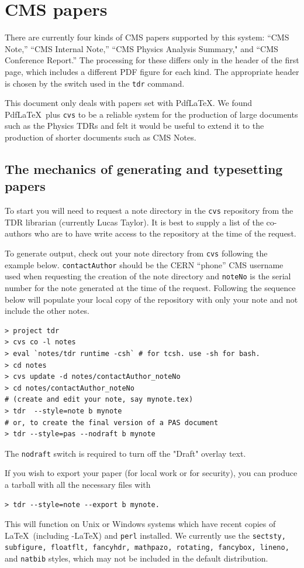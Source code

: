 \section{CMS papers}
There are currently four kinds of CMS papers supported by this system: ``CMS Note,''
``CMS Internal Note,''    ``CMS Physics Analysis Summary," and ``CMS Conference Report.''
The processing for these differs only in the header of the first page,
which includes a different PDF figure  for each kind. The
appropriate header is chosen by the switch used in the
\texttt{tdr}
command.

This document only deals with papers set with Pdf\LaTeX. We found Pdf\LaTeX\ plus \texttt{cvs} to be a reliable system for the production of
large documents such as the Physics TDRs and felt it would be useful to extend it to the production of shorter documents such as CMS Notes.

\subsection{The mechanics of generating and typesetting papers}

To start
you will need to request a note directory in the \texttt{cvs} repository from the TDR librarian (currently
Lucas Taylor). It is best to supply a list of the co-authors who are to have write access to the repository at the time of the request.

To generate output, check out your note
directory from \texttt{cvs} following the example below. \texttt{contactAuthor} should be the CERN ``phone'' CMS username used when requesting the creation of the note directory and \texttt{noteNo} is
the serial number for the note generated at the time of the request. Following the sequence below will populate your local copy of the repository  with only your note and not include the other notes.

\begin{verbatim}
> project tdr
> cvs co -l notes
> eval `notes/tdr runtime -csh` # for tcsh. use -sh for bash.
> cd notes
> cvs update -d notes/contactAuthor_noteNo
> cd notes/contactAuthor_noteNo
# (create and edit your note, say mynote.tex)
> tdr  --style=note b mynote
# or, to create the final version of a PAS document
> tdr --style=pas --nodraft b mynote
\end{verbatim}

The \texttt{nodraft} switch is required to turn off the "Draft" overlay text.

If you wish to export your paper (for local work or for security), you can produce a tarball with all the necessary files with
\begin{verbatim}
> tdr --style=note --export b mynote.
\end{verbatim}
This will function on  Unix or Windows systems which have recent copies of \LaTeX\ (including \AmS-\LaTeX) and \texttt{perl} installed. We currently use the \texttt{sectsty, subfigure, floatflt,
fancyhdr, mathpazo, rotating, fancybox, lineno,} and \texttt{natbib} styles, which may not be included in the default distribution.



